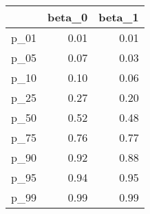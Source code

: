\documentclass[12pt]{article}
\begin{document}
\begin{table}[ht]
\centering
\begin{tabular}{rrr}
  \hline
 & beta\_0 & beta\_1 \\ 
  \hline
p\_01 & 0.01 & 0.01 \\ 
  p\_05 & 0.07 & 0.03 \\ 
  p\_10 & 0.10 & 0.06 \\ 
  p\_25 & 0.27 & 0.20 \\ 
  p\_50 & 0.52 & 0.48 \\ 
  p\_75 & 0.76 & 0.77 \\ 
  p\_90 & 0.92 & 0.88 \\ 
  p\_95 & 0.94 & 0.95 \\ 
  p\_99 & 0.99 & 0.99 \\ 
   \hline
\end{tabular}
\end{table}
\end{document}
